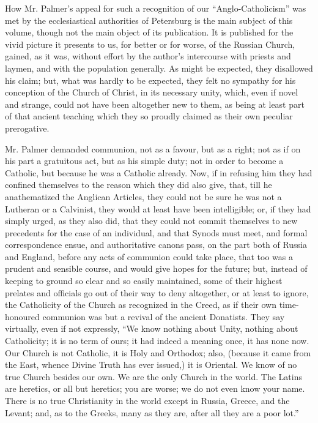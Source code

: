 How Mr. Palmer's appeal for such a recognition of
our ``Anglo-Catholicism'' was met by the ecclesiastical authorities of
Petersburg is the main subject of this volume, though not the
main object of its publication. It is published for the vivid picture
it presents to us, for better or for worse, of the Russian Church,
gained, as it was, without effort by the author's intercourse with
priests and laymen, and with the population generally. As might be
expected, they disallowed his claim; but, what was hardly to be
expected, they felt no sympathy for his conception of the Church of
Christ, in its necessary unity, which, even if novel and strange,
could not have been altogether new to them, as being at least part of
that ancient teaching which they so proudly claimed as their own
peculiar prerogative.

Mr. Palmer demanded communion, not as a favour,
but as a right; not as if on his part a gratuitous act, but as his
simple duty; not in order to become a Catholic, but because he was a
Catholic already. Now, if in refusing him they had confined themselves
to the reason which they did also give, that, till he anathematized
the Anglican Articles, they could not be sure he was not a
Lutheran or a Calvinist, they would at least have been intelligible;
or, if they had simply urged, as they also did, that they could not
commit themselves to new precedents for the case of an individual, and
that Synods must meet, and formal correspondence ensue, and
authoritative canons pass, on the part both of Russia and England,
before any acts of communion could take place, that too was a prudent
and sensible course, and would give hopes for the future; but, instead
of keeping to ground so clear and so easily maintained, some of their
highest prelates and officials go out of their way to deny altogether,
or at least to ignore, the Catholicity of the Church as recognized in
the Creed, as if their own time-honoured communion was but a revival
of the ancient Donatists. They say virtually, even if not expressly, ``We
know nothing about Unity, nothing about Catholicity; it is no term of
ours; it had indeed a meaning once, it has none now. Our Church is
not Catholic, it is Holy and Orthodox; also, (because it came from the
East, whence Divine Truth has ever issued,) it is Oriental. We know of
no true Church besides our own. We are the only Church in the world.
The Latins are heretics, or all but heretics; you are worse; we do not
even know your name. There is no true Christianity in the world except
in Russia, Greece, and the Levant; and, as to the Greeks, many as they
are, after all they are a poor lot.''

